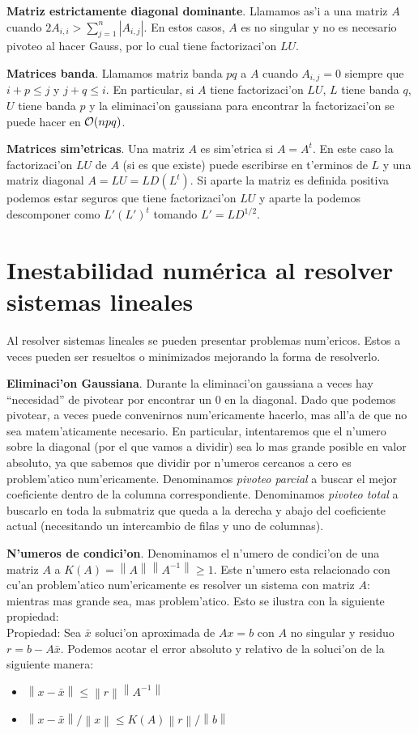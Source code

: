 \documentclass[a4paper,spanish]{article}
\newcommand{\norma}[1]{\left\|#1\right\|}
\newcommand{\Ode}[0]{{\cal O}}
\newenvironment{items}{
		\vspace*{-2\topsep}
		\begin{itemize} 
		\addtolength{\itemsep}{-0.5\baselineskip}
		}{\end{itemize}\vspace*{-\topsep}}
\begin{document}
\textbf{Matriz estrictamente diagonal dominante}. Llamamos as'i a una matriz
$A$ cuando $2A_{i,i} > \sum_{j=1}^n |A_{i,j}|$. En estos casos, $A$ es no
singular y no es necesario pivoteo al hacer Gauss, por lo cual tiene
factorizaci'on $LU$.

\textbf{Matrices banda}. Llamamos matriz banda $pq$ a $A$ cuando $A_{i,j} = 0$
siempre que $i+p \leq j$ y $j+q \leq i$. En particular, si $A$ tiene
factorizaci'on $LU$, $L$ tiene banda $q$, $U$ tiene banda $p$ y la eliminaci'on
gaussiana para encontrar la factorizaci'on se puede hacer en $\Ode(npq)$.

\textbf{Matrices sim'etricas}. Una matriz $A$ es sim'etrica si $A = A^t$. En
este caso la factorizaci'on $LU$ de $A$ (si es que existe) puede escribirse
en t'erminos de $L$ y una matriz diagonal $A = LU = LD(L^t)$. Si aparte la
matriz es definida positiva podemos estar seguros que tiene factorizaci'on
$LU$ y aparte la podemos descomponer como $L'(L')^t$ tomando $L' = LD^{1/2}$.

\section{Inestabilidad num\'erica al resolver sistemas lineales}

Al resolver sistemas lineales se pueden presentar problemas num'ericos. Estos
a veces pueden ser resueltos o minimizados mejorando la forma de resolverlo.

\textbf{Eliminaci'on Gaussiana}. Durante la eliminaci'on gaussiana a veces hay
``necesidad'' de pivotear por encontrar un $0$ en la diagonal. Dado que
podemos pivotear, a veces puede convenirnos num'ericamente hacerlo, mas all'a
de que no sea matem'aticamente necesario. En particular, intentaremos que el
n'umero sobre la diagonal (por el que vamos a dividir) sea lo mas grande
posible en valor absoluto, ya que sabemos que dividir por n'umeros cercanos a
cero es problem'atico num'ericamente. Denominamos \emph{pivoteo parcial} a 
buscar el mejor coeficiente dentro de la columna correspondiente. Denominamos
\emph{pivoteo total} a buscarlo en toda la submatriz que queda a la derecha
y abajo del coeficiente actual (necesitando un intercambio de filas y uno de
columnas).

\textbf{N'umeros de condici'on}. Denominamos el n'umero de condici'on de una
matriz $A$ a $K(A) = \norma{A} \norma{A^{-1}} \geq 1$. Este n'umero esta
relacionado con cu'an problem'atico num'ericamente es resolver un sistema con
matriz $A$: mientras mas grande sea, mas problem'atico. Esto se ilustra con
la siguiente propiedad: \\
Propiedad: Sea $\bar{x}$ soluci'on aproximada de $Ax = b$ con $A$ no singular
y residuo $r = b - A\bar{x}$. Podemos acotar el error absoluto y relativo de
la soluci'on de la siguiente manera:
\begin{items}
\item $\norma{x-\bar{x}} \leq \norma{r} \norma{A^{-1}}$
\item $\norma{x-\bar{x}} / \norma{x} \leq K(A) \norma{r} / \norma{b}$
\end{items}
\end{document}
